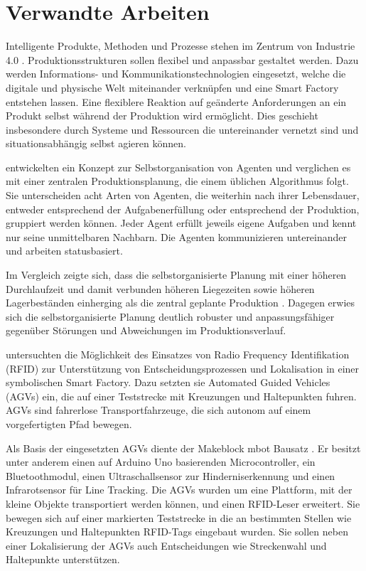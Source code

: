 \chapter{Verwandte Arbeiten}

Intelligente Produkte, Methoden und Prozesse stehen im Zentrum von Industrie 4.0 \parencite{arbeitsbericht}. Produktionsstrukturen sollen flexibel und anpassbar gestaltet werden. Dazu werden Informations- und Kommunikationstechnologien eingesetzt, welche die digitale und physische Welt miteinander verknüpfen und eine Smart Factory entstehen lassen. Eine flexiblere Reaktion auf geänderte Anforderungen an ein Produkt selbst während der Produktion wird ermöglicht. Dies geschieht insbesondere durch Systeme und Ressourcen die untereinander vernetzt sind und situationsabhängig selbst agieren können.

\textcite{agents} entwickelten ein Konzept zur Selbstorganisation von Agenten und verglichen es mit einer zentralen Produktionsplanung, die einem üblichen Algorithmus folgt. Sie unterscheiden acht Arten von Agenten, die weiterhin nach ihrer Lebensdauer, entweder entsprechend der Aufgabenerfüllung oder entsprechend der Produktion, gruppiert werden können. Jeder Agent erfüllt jeweils eigene Aufgaben und kennt nur seine unmittelbaren Nachbarn. Die Agenten kommunizieren untereinander und arbeiten statusbasiert.

Im Vergleich zeigte sich, dass die selbstorganisierte Planung mit einer höheren Durchlaufzeit und damit verbunden höheren Liegezeiten sowie höheren Lagerbeständen einherging als die zentral geplante Produktion \parencite{agents}. Dagegen erwies sich die selbstorganisierte Planung deutlich robuster und anpassungsfähiger gegenüber Störungen und Abweichungen im Produktionsverlauf.

\textcite{rfid} untersuchten die Möglichkeit des Einsatzes von Radio Frequency Identifikation (RFID) zur Unterstützung von Entscheidungsprozessen und Lokalisation in einer symbolischen Smart Factory. Dazu setzten sie Automated Guided Vehicles (AGVs) ein, die auf einer Teststrecke mit Kreuzungen und Haltepunkten fuhren. AGVs sind fahrerlose Transportfahrzeuge, die sich autonom auf einem vorgefertigten Pfad bewegen.

Als Basis der eingesetzten AGVs diente der Makeblock mbot Bausatz \parencite{rfid}. Er besitzt unter anderem einen auf Arduino Uno basierenden Microcontroller, ein Bluetoothmodul, einen Ultraschallsensor zur Hinderniserkennung und einen Infrarotsensor für Line Tracking. Die AGVs wurden um eine Plattform, mit der kleine Objekte transportiert werden können, und einen RFID-Leser erweitert. Sie bewegen sich auf einer markierten Teststrecke in die an bestimmten Stellen wie Kreuzungen und Haltepunkten RFID-Tags eingebaut wurden. Sie sollen neben einer Lokalisierung der AGVs auch Entscheidungen wie Streckenwahl und Haltepunkte unterstützen.

